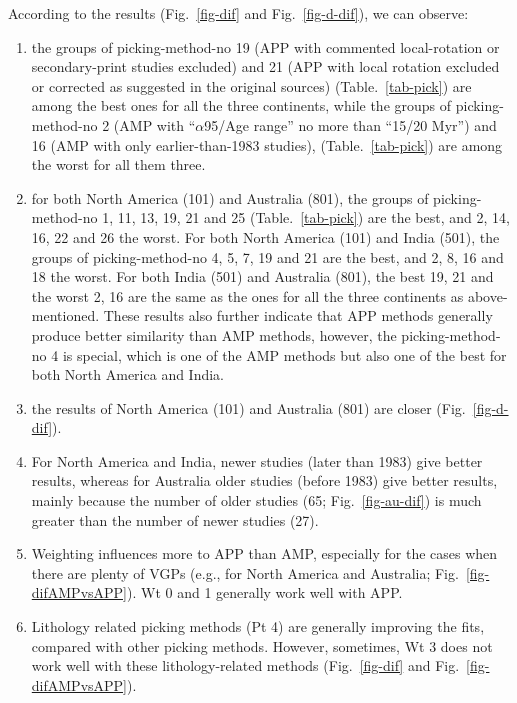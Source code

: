 According to the results (Fig.~\ref{fig-dif} and Fig.~\ref{fig-d-dif}), we can
observe:
%
\begin{enumerate}
  \item the groups of picking-method-no 19 (APP with commented local-rotation or
        secondary-print studies excluded) and 21 (APP with local rotation
        excluded or corrected as suggested in the original sources)
        (Table.~\ref{tab-pick}) are among the best ones for all the three
        continents, while the groups of picking-method-no 2 (AMP with
        ``$\alpha$95/Age range'' no more than ``15\degree/20 Myr'') and 16 (AMP
        with only earlier-than-1983 studies), (Table.~\ref{tab-pick}) are among
        the worst for all them three.
  \item for both North America (101) and Australia (801), the groups of
        picking-method-no 1, 11, 13, 19, 21 and 25 (Table.~\ref{tab-pick}) are
        the best, and 2, 14, 16, 22 and 26 the worst. For both North America
		(101) and India (501), the groups of picking-method-no 4, 5, 7, 19 and
		21 are the best, and 2, 8, 16 and 18 the worst. For both India (501)
		and Australia (801), the best 19, 21 and the worst 2, 16 are the same as
		the ones for all the three continents as above-mentioned. These results
		also further indicate that APP methods generally produce better
		similarity than AMP methods, however, the picking-method-no 4 is
		special, which is one of the AMP methods but also one of the best for
		both North America and India.
  \item the results of North America (101) and Australia (801) are closer
		(Fig.~\ref{fig-d-dif}).
  \item For North America and India, newer studies (later than 1983) give
		better results, whereas for Australia older studies (before 1983) give
		better results, mainly because the number of older studies (65;
		Fig.~\ref{fig-au-dif}) is much greater than the number of newer studies
		(27).
  \item Weighting influences more to APP than AMP, especially for the cases
		when there are plenty of VGPs (e.g., for North America and Australia;
		Fig.~\ref{fig-difAMPvsAPP}). Wt 0 and 1 generally work well with APP.
  \item Lithology related picking methods (Pt 4) are generally
		improving the fits, compared with other picking methods. However,
		sometimes, Wt 3 does not work well with these lithology-related methods
		(Fig.~\ref{fig-dif} and Fig.~\ref{fig-difAMPvsAPP}).
\end{enumerate}


